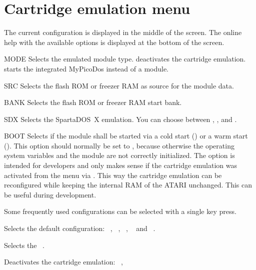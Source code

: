 \section{Cartridge emulation menu}
The current configuration is displayed in the middle of the screen.
The online help with the available options is displayed at the bottom of the
screen.

\begin{fcmdlist}
\item[MODE]
Selects the emulated module type. \newline
{} deactivates the cartridge emulation. \newline
{} starts the integrated MyPicoDos instead of a module.

\item[SRC]
Selects the flash ROM or freezer RAM as source for the module data.

\item[BANK]
Selects the flash ROM or freezer RAM start bank.

\item[SDX]
Selects the SpartaDOS~X emulation. You can choose between
,\linebreak
{},  and .

\item[BOOT]
Selects if the module shall be started via a cold start () or
a warm start (). This option should normally be set to 
, because otherwise the operating system variables and the module are
not correctly initialized. The option  is intended for developers and only makes
sense if the cartridge emulation was activated from the \frz menu via
 \linebreak {}. This way the cartridge emulation can be reconfigured
while keeping the internal RAM of the ATARI unchanged. This can be useful during
development.
\end{fcmdlist}

Some frequently used configurations can be selected with a single key press.

\begin{flist}
\item[\fkey{D}]
Selects the default configuration: ~, ~,
~, ~
and ~.

\item[\fkey{P}]
Selects the ~.

\item[\fkey{O}]
Deactivates the cartridge emulation: ~, ~
\end{flist}

